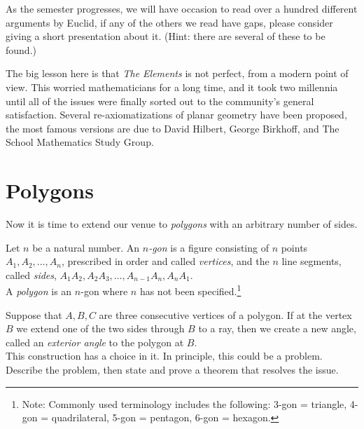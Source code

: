 \begin{problem}
As the semester progresses, we will have occasion to read over a hundred different arguments by Euclid, if any of the others we read have gaps, please consider giving a short presentation about it.
(Hint: there are several of these to be found.)
\end{problem}

The big lesson here is that \emph{The Elements} is not perfect, from a modern point of view.
This worried mathematicians for a long time, and it took two millennia until all of the issues were finally sorted out to the community's general satisfaction.
Several re-axiomatizations of planar geometry have been proposed, the most famous versions are due to David Hilbert, George Birkhoff, and The School Mathematics Study Group.



\chapter{Polygons}
Now it is time to extend our venue to \emph{polygons} with an arbitrary number of sides.

\begin{definition}\label{defn:n-gon}
Let $n$ be a natural number. An \emph{$n$-gon} is a figure consisting of $n$ points $A_1, A_2, \ldots, A_n$, prescribed in order and called \emph{vertices}, and the $n$ line segments, called \emph{sides}, $A_1A_2, A_2A_3, \ldots, A_{n-1}A_n, A_nA_1$.\\
A \emph{polygon} is an $n$-gon where $n$ has not been specified.\footnote{Note: Commonly used terminology includes the following: 3-gon = triangle, 4-gon = quadrilateral, 5-gon = pentagon, 6-gon = hexagon.}
\end{definition}



\begin{problem}\label{prob:exterior-angle}
Suppose that $A,B,C$ are three consecutive vertices of a polygon. 
If at the vertex $B$ we extend one of the two sides through $B$ to a ray, then we create a new angle, called an \emph{exterior angle} to the polygon at $B$.\\
This construction has a choice in it. 
In principle, this could be a problem. 
Describe the problem, then state and prove a theorem that resolves the issue.
\end{problem}




